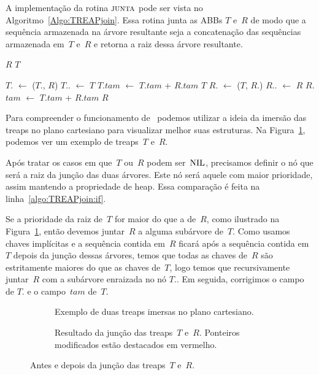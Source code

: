 A implementação da rotina $\text{\scshape junta}$ pode ser vista no Algoritmo~\ref{Algo:TREAPjoin}.
Essa rotina junta as ABBs $T$ e~$R$ de modo que a sequência armazenada na árvore resultante seja a concatenação das sequências armazenada em~$T$ e~$R$ e retorna a raiz dessa árvore resultante.

\begin{algorithm}
\caption{\treapJoin($T$, $R$)}
\label{Algo:TREAPjoin}
\begin{algorithmic}[1]
 \Return $R$
\EndIf
{} \Return $T$
\EndIf

\label{algo:TREAPjoin:if}
  \State $T$. $\gets$ \treapJoin($T$., $R$)
  \State $T$.. $\gets$ $T$
  \State $T$.$tam$ $\gets$ $T$.$tam$ + $R$.$tam$
  \State \Return $T$
\Else 
  \State $R$. $\gets$ \treapJoin($T$, $R$.)
  \State $R$.. $\gets$ $R$
  \State $R$.$tam$ $\gets$ $T$.$tam$ + $R$.$tam$
  \State \Return $R$
\EndIf
\end{algorithmic}
\end{algorithm}

Para compreender o funcionamento de~\treapJoin{} podemos utilizar a ideia da imersão das treaps no plano cartesiano para visualizar melhor suas estruturas.
Na Figura~\ref{fig:treap-join}, podemos ver um exemplo de treaps~$T$ e~$R$.

Após tratar os casos em que~$T$ ou~$R$ podem ser~$\text{NIL}$, precisamos definir o nó que será a raiz da junção das duas árvores.
Este nó será aquele com maior prioridade, assim mantendo a propriedade de heap.
Essa comparação é feita na linha~\ref{algo:TREAPjoin:if}.

Se a prioridade da raiz de~$T$ for maior do que a de~$R$, como ilustrado na Figura~\ref{fig:treap-join}, então devemos juntar~$R$ a alguma subárvore de~$T$.
Como usamos chaves implícitas e a sequência contida em~$R$ ficará após a sequência contida em~$T$ depois da junção dessas árvores,
temos que todas as chaves de~$R$ são estritamente maiores do que as chaves de~$T$, logo temos que recursivamente juntar~$R$ com a subárvore enraizada no nó $T$..
Em seguida, corrigimos o campo  de $T$. e o campo~$tam$ de~$T$.


\begin{figure}[htb]
\begin{subfigure}{0.4\textwidth}
\scalebox{0.55}{

}
\caption{Exemplo de duas treaps imersas no plano cartesiano.}
\label{fig:treap-join}
\end{subfigure}
\hspace{1cm}
\begin{subfigure}{0.4\textwidth}
\scalebox{0.55}{

}
\caption{Resultado da junção das treaps~$T$ e~$R$. Ponteiros modificados estão destacados em vermelho.}
\label{fig:treap-join-depois}
\end{subfigure}
\caption{Antes e depois da junção das treaps~$T$ e~$R$.}
\end{figure}


